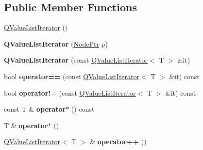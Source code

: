 \subsection*{Public Member Functions}
\begin{DoxyCompactItemize}
\item 
\mbox{\hyperlink{class_q_value_list_iterator_adc014e4e90024a0a1eb42a93247de28f}{Q\+Value\+List\+Iterator}} ()
\item 
\mbox{\label{class_q_value_list_iterator_a4e7ece7c4d1853257e5e31686951a1ff}} 
{\bfseries Q\+Value\+List\+Iterator} (\mbox{\hyperlink{class_q_value_list_iterator_abf409d04d86ddd5977132fecb2e6db61}{Node\+Ptr}} p)
\item 
\mbox{\label{class_q_value_list_iterator_a7651a3d207366005b664f05589c730c4}} 
{\bfseries Q\+Value\+List\+Iterator} (const \mbox{\hyperlink{class_q_value_list_iterator}{Q\+Value\+List\+Iterator}}$<$ T $>$ \&it)
\item 
\mbox{\label{class_q_value_list_iterator_aa285e7c05c92c8cbcdfd8bc1d17e4bef}} 
bool {\bfseries operator==} (const \mbox{\hyperlink{class_q_value_list_iterator}{Q\+Value\+List\+Iterator}}$<$ T $>$ \&it) const
\item 
\mbox{\label{class_q_value_list_iterator_ae35e4177aed16192672c04e1843d8ef8}} 
bool {\bfseries operator!=} (const \mbox{\hyperlink{class_q_value_list_iterator}{Q\+Value\+List\+Iterator}}$<$ T $>$ \&it) const
\item 
\mbox{\label{class_q_value_list_iterator_af6ab804448e87a9b08386754d34959e3}} 
const T \& {\bfseries operator$\ast$} () const
\item 
\mbox{\label{class_q_value_list_iterator_ab5b820dd99c29c8ffbe68cac907ab47c}} 
T \& {\bfseries operator$\ast$} ()
\item 
\mbox{\label{class_q_value_list_iterator_a7992e5edc84b985360ea4340a32d3aef}} 
\mbox{\hyperlink{class_q_value_list_iterator}{Q\+Value\+List\+Iterator}}$<$ T $>$ \& {\bfseries operator++} ()
\item 
\mbox{\label{class_q_value_list_iterator_a01a629072be79007df6c6ff48c0a0af2}} 

\end{DoxyCompactItemize}
